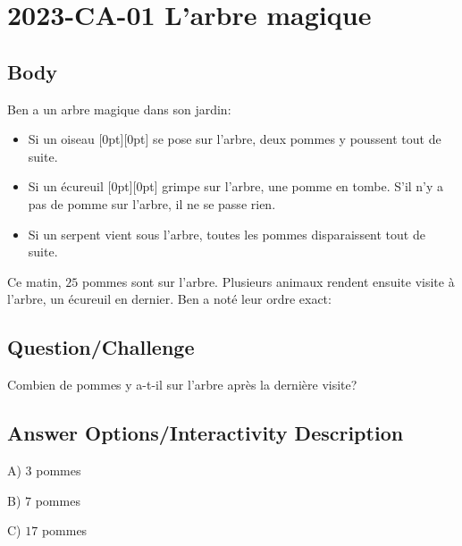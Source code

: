 \documentclass[a4paper,11pt]{report}
\newcommand{\taskGraphicsFolder}{..}
\begin{document}
\section*{\centering{} 2023-CA-01 L’arbre magique}


\subsection*{Body}

Ben a un arbre magique dans son jardin:

\begin{itemize}
  \item Si un oiseau \raisebox{-0.5ex}[0pt][0pt]{} se pose sur l’arbre, deux pommes y poussent tout de suite.
  \item Si un écureuil \raisebox{-0.5ex}[0pt][0pt]{} grimpe sur l’arbre, une pomme en tombe. S’il n’y a pas de pomme sur l’arbre, il ne se passe rien.
  \item Si un serpent \raisebox{-0.5ex}{} vient sous l’arbre, toutes les pommes disparaissent tout de suite.
\end{itemize}

Ce matin, $25$ pommes sont sur l’arbre. Plusieurs animaux rendent ensuite visite à l’arbre, un écureuil en dernier. Ben a noté leur ordre exact:

{\centering%
\par}

{\em

\subsection*{Question/Challenge}

Combien de pommes y a-t-il sur l’arbre après la dernière visite?

}\begingroup
\renewcommand{\arraystretch}{1.5}
\subsection*{Answer Options/Interactivity Description}

A) $3$ pommes

B) $7$ pommes

C) $17$ pommes
\end{document}
